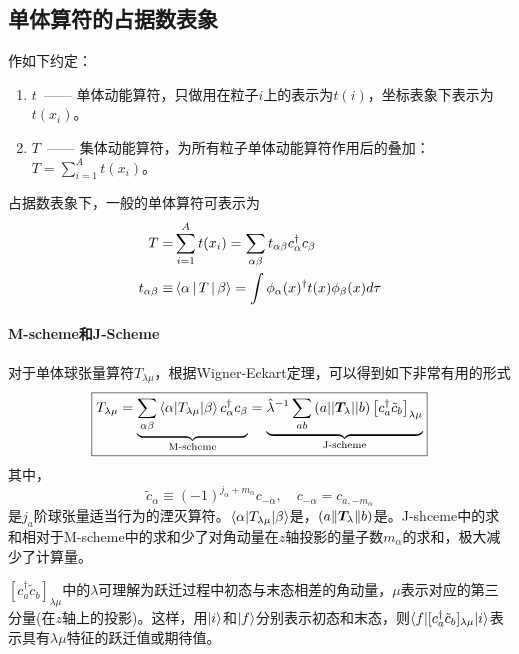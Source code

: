 \subsection{单体算符的占据数表象}
作如下约定：
\begin{enumerate}
    \item $t$\ —— 单体动能算符，只做用在粒子$i$上的表示为$t(i)$，坐标表象下表示为$t(x_i)$。
    \item $T$\ —— 集体动能算符，为所有粒子单体动能算符作用后的叠加：$T = \sum_{i = 1}^{A} t(x_i)$。
\end{enumerate}
占据数表象下，一般的单体算符可表示为
\begin{equation}
    \begin{aligned}
        T =& \sum_{i = 1}^{A} t(x_i) = \sum_{\alpha\beta} t_{\alpha\beta}c_{\alpha}^{\dagger}c_{\beta} \\
        t_{\alpha\beta} \equiv & \Braket{\alpha | T | \beta} = \int \phi_{\alpha}(x)^{\dagger} t(x) \phi_{\beta}(x) d\tau
    \end{aligned}
\end{equation}

\paragraph*{M-scheme和J-Scheme}
对于单体球张量算符$T_{\lambda\mu}$，根据Wigner-Eckart定理，可以得到如下非常有用的形式
\begin{equation}
    \boxed{
    T_{\lambda\mu} = 
    \underbrace{ \sum_{\alpha\beta}\braket{\alpha | T_{\lambda\mu} | \beta} c_{\alpha}^{\dagger} c_{\beta}}_{\text{M-scheme}}
    =\underbrace{\hat{\lambda}^{-1} \sum_{ab}\left(a || \bm{T}_{\lambda} || b\right) \left[c_{a}^{\dagger}\tilde{c}_{b} \right]_{\lambda\mu}}_{\text{J-scheme}}
    }
    \label{eq:sing-reduced-part-elem}
\end{equation}
其中，
\begin{equation}
    \tilde{c}_{\alpha} \equiv (-1)^{j_{\alpha} + m_{\alpha}} c_{-\alpha},
    \quad
    c_{-\alpha} = c_{a, -m_\alpha}
    \label{eq:sp.annihilation}
\end{equation}
是$j_{a}$阶球张量适当行为的湮灭算符。$\braket{\alpha | T_{\lambda\mu} | \beta}$是，$\left(a \| \bm{T}_{\lambda} \| b\right)$是。J-shceme中的求和相对于M-scheme中的求和少了对角动量在$z$轴投影的量子数$m_{\alpha}$的求和，极大减少了计算量。

$\left[c_{a}^{\dagger}\tilde{c}_{b}\right]_{\lambda\mu}$中的$\lambda$可理解为跃迁过程中初态与末态相差的角动量，$\mu$表示对应的第三分量(在$z$轴上的投影)。这样，用$\ket{i}$和$\ket{f}$分别表示初态和末态，则$\braket{f | [c_{a}^{\dagger}\tilde{c}_{b}]_{\lambda\mu} | i}$表示具有$\lambda\mu$特征的跃迁值或期待值。



